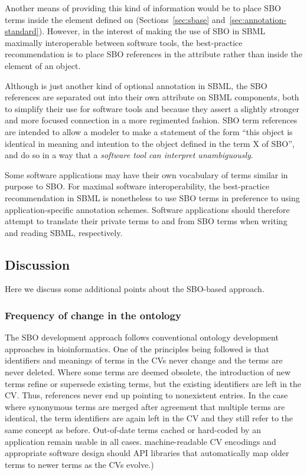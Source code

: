 \begin{blockChanged}
Another means of providing this kind of information would be to
place SBO terms inside the  element
defined on \SBase (Sections~\ref{sec:sbase} and~\ref{sec:annotation-standard}).
However, in the interest of making the use of SBO in SBML
maximally interoperable between software tools, the best-practice
recommendation is to place SBO references in the 
attribute rather than inside the 
element of an object.

Although  is just another kind of optional
annotation in SBML, the SBO references are separated out into
their own attribute on SBML components, both to simplify their use
for software tools and because they assert a slightly stronger and
more focused connection in a more regimented fashion.  SBO term
references are intended to allow a modeler to make a statement of
the form ``this object is identical in meaning and intention to
the object defined in the term X of SBO'', and do so in a way
that a \emph{software tool can interpret unambiguously}.

Some software applications may have their own vocabulary of terms
similar in purpose to SBO.  For maximal software interoperability,
the best-practice recommendation in SBML is nonetheless to use SBO
terms in preference to using application-specific annotation
schemes.  Software applications should therefore attempt to
translate their private terms to and from SBO terms when writing
and reading SBML, respectively.

\end{blockChanged}

\subsection{Discussion}

Here we discuss some additional points about the SBO-based
approach.

\subsubsection{Frequency of change in the ontology}
\label{sec:sbo-frequency-of-change}

The SBO development approach follows conventional ontology
development approaches in bioinformatics.  One of the principles
being followed is that identifiers and meanings of terms in the
CVs never change and the terms are never deleted.  Where some
terms are deemed obsolete, the introduction of new terms refine or
supersede existing terms, but the existing identifiers are left in
the CV.  Thus, references never end up pointing to nonexistent
entries.  In the case where synonymous terms are merged after
agreement that multiple terms are identical, the term identifiers
are again left in the CV and they still refer to the same concept
as before.  Out-of-date terms cached or hard-coded by an
application remain usable in all cases.   machine-readable
CV encodings and appropriate software design should   API libraries that automatically map
older terms to newer terms as the CVs evolve.)

